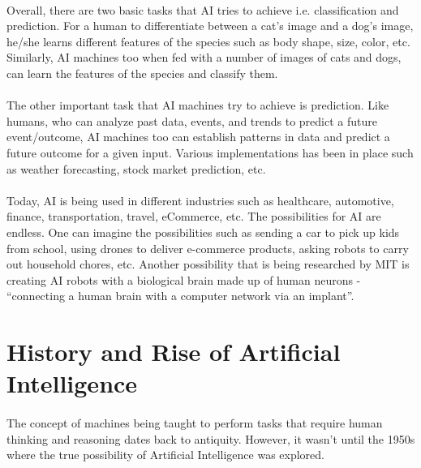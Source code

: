 \documentclass[12pt]{article}
\begin{document}
\paragraph{}
Overall, there are two basic tasks that AI tries to achieve i.e. classification and prediction. For a human to differentiate between a cat’s image and a dog’s image, he/she learns different features of the species such as body shape, size, color, etc. Similarly, AI machines too when fed with a number of images of cats and dogs, can learn the features of the species and classify them.

\paragraph{}
The other important task that AI machines try to achieve is prediction. Like humans, who can analyze past data, events, and trends to predict a future event/outcome, AI machines too can establish patterns in data and predict a future outcome for a given input. Various implementations has been in place such as weather forecasting, stock market prediction, etc.

\paragraph{}
Today, AI is being used in different industries such as healthcare, automotive, finance, transportation, travel, eCommerce, etc. The possibilities for AI are endless. One can imagine the possibilities such as sending a car to pick up kids from school, using drones to deliver e-commerce products, asking robots to carry out household chores, etc. Another possibility that is being researched by MIT is creating AI robots with a biological brain made up of human neurons - “connecting a human brain with a computer network via an implant”.\cite{Kevin Warwick}

\newpage


\section{History and Rise of Artificial Intelligence}
\paragraph{}
The concept of machines being taught to perform tasks that require human thinking and reasoning dates back to antiquity. However, it wasn’t until the 1950s where the true possibility of Artificial Intelligence was explored. 
\end{document}
